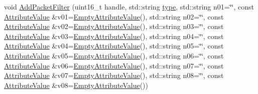 \begin{DoxyCompactItemize}
void \hyperlink{classns3_1_1TrafficControlHelper_aa9bde683bb9913c5e273dffde8306c08}{Add\+Packet\+Filter} (uint16\+\_\+t handle, std\+::string \hyperlink{visualizer-ideas_8txt_add98db9e15e2a58cf2b57623e7aa893a}{type}, std\+::string n01=\char`\"{}\char`\"{}, const \hyperlink{classns3_1_1AttributeValue}{Attribute\+Value} \&v01=\hyperlink{classns3_1_1EmptyAttributeValue}{Empty\+Attribute\+Value}(), std\+::string n02=\char`\"{}\char`\"{}, const \hyperlink{classns3_1_1AttributeValue}{Attribute\+Value} \&v02=\hyperlink{classns3_1_1EmptyAttributeValue}{Empty\+Attribute\+Value}(), std\+::string n03=\char`\"{}\char`\"{}, const \hyperlink{classns3_1_1AttributeValue}{Attribute\+Value} \&v03=\hyperlink{classns3_1_1EmptyAttributeValue}{Empty\+Attribute\+Value}(), std\+::string n04=\char`\"{}\char`\"{}, const \hyperlink{classns3_1_1AttributeValue}{Attribute\+Value} \&v04=\hyperlink{classns3_1_1EmptyAttributeValue}{Empty\+Attribute\+Value}(), std\+::string n05=\char`\"{}\char`\"{}, const \hyperlink{classns3_1_1AttributeValue}{Attribute\+Value} \&v05=\hyperlink{classns3_1_1EmptyAttributeValue}{Empty\+Attribute\+Value}(), std\+::string n06=\char`\"{}\char`\"{}, const \hyperlink{classns3_1_1AttributeValue}{Attribute\+Value} \&v06=\hyperlink{classns3_1_1EmptyAttributeValue}{Empty\+Attribute\+Value}(), std\+::string n07=\char`\"{}\char`\"{}, const \hyperlink{classns3_1_1AttributeValue}{Attribute\+Value} \&v07=\hyperlink{classns3_1_1EmptyAttributeValue}{Empty\+Attribute\+Value}(), std\+::string n08=\char`\"{}\char`\"{}, const \hyperlink{classns3_1_1AttributeValue}{Attribute\+Value} \&v08=\hyperlink{classns3_1_1EmptyAttributeValue}{Empty\+Attribute\+Value}())
\item 

\end{DoxyCompactItemize}

